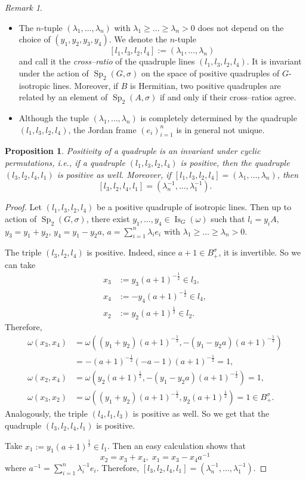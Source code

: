\documentclass[a4paper,oneside,11pt]{amsart}
\DeclareMathOperator{\Sp}{Sp}
\DeclareMathOperator{\Is}{Is}
\theoremstyle{plain}
\newtheorem{prop}[teo]{Proposition}
\theoremstyle{definition}
\theoremstyle{remark}
\newtheorem{rem}[teo]{Remark}
\newcommand{\defin}{\emph}
\begin{document}
\begin{rem}
\begin{itemize}
\item The $n$-tuple $(\lambda_1,\dots,\lambda_n)$ with $\lambda_1\geq\dots\geq\lambda_n>0$ does not depend on the choice of $(y_1,y_2,y_3,y_4)$. 
We denote the $n$-tuple $$[l_1,l_3,l_2,l_4]:=(\lambda_1,\dots,\lambda_n)$$
and call it the \defin{cross--ratio} of the quadruple lines $(l_1,l_3,l_2,l_4)$. It is invariant under the action of $\Sp_2(G,\sigma)$ on the space of positive quadruples of $G$-isotropic lines. Moreover, if $B$ is Hermitian, two positive quadruples are related by an element of $\Sp_2(A,\sigma)$ if and only if their cross--ratios agree.
\item Although the tuple $(\lambda_1,\dots,\lambda_n)$ is completely determined by the quadruple $(l_1,l_3,l_2,l_4)$, the Jordan frame $(e_i)_{i=1}^n$ is in general not unique.
\end{itemize}
\end{rem}

\begin{prop}
Positivity of a quadruple is an invariant under cyclic permutations, i.e., if a quadruple $(l_1,l_3,l_2,l_4)$ is positive, then the quadruple $(l_3,l_2,l_4,l_1)$ is positive as well. Moreover, if $[l_1,l_3,l_2,l_4]=(\lambda_1,\dots,\lambda_n)$, then $$[l_3,l_2,l_4,l_1]=(\lambda_n^{-1},\dots,\lambda_1^{-1}).$$
\end{prop}

\begin{proof}
Let $(l_1,l_3,l_2,l_4)$ be a positive quadruple of isotropic lines. Then up to action of $\Sp_2(G,\sigma)$, there exist $y_1,\dots,y_4\in \Is_G(\omega)$ such that $l_i=y_iA$, $y_3=y_1+y_2$, $y_4=y_1-y_2a$, $a=\sum_{i=1}^n\lambda_ie_i$ with $\lambda_1\geq\dots\geq\lambda_n>0$.

The triple $(l_3,l_2,l_4)$ is positive. Indeed, since $a+1\in B^{\sigma}_+$, it is invertible. So we can take
\begin{align*}
x_3&:=y_3(a+1)^{-\frac{1}{2}}\in l_3,\\
x_4&:=-y_4(a+1)^{-\frac{1}{2}}\in l_4,\\
x_2&:=y_2(a+1)^{\frac{1}{2}}\in l_2.    
\end{align*}
Therefore,
\begin{align*}
\omega(x_3,x_4)&=\omega((y_1+y_2)(a+1)^{-\frac{1}{2}},-(y_1-y_2a)(a+1)^{-\frac{1}{2}})\\
&=-(a+1)^{-\frac{1}{2}}(-a-1)(a+1)^{-\frac{1}{2}}=1,\\
\omega(x_2,x_4)&=\omega(y_2(a+1)^{\frac{1}{2}},-(y_1-y_2a)(a+1)^{-\frac{1}{2}})=1,\\
\omega(x_3,x_2)&=\omega((y_1+y_2)(a+1)^{-\frac{1}{2}},y_2(a+1)^{\frac{1}{2}})=1\in B^{\sigma}_+.
\end{align*}
Analogously, the triple $(l_4,l_1,l_3)$ is positive as well. So we get that the quadruple $(l_3,l_2,l_4,l_1)$ is positive.

Take $x_1:=y_1(a+1)^{\frac{1}{2}}\in l_1$. Then an easy calculation shows that
$$x_2=x_3+x_4,\; x_1=x_3-x_4a^{-1}$$
where $a^{-1}=\sum_{i=1}^n\lambda_i^{-1}e_i$. Therefore, $[l_3,l_2,l_4,l_1]=(\lambda_n^{-1},\dots,\lambda_1^{-1})$.
\end{proof}
\end{document}
